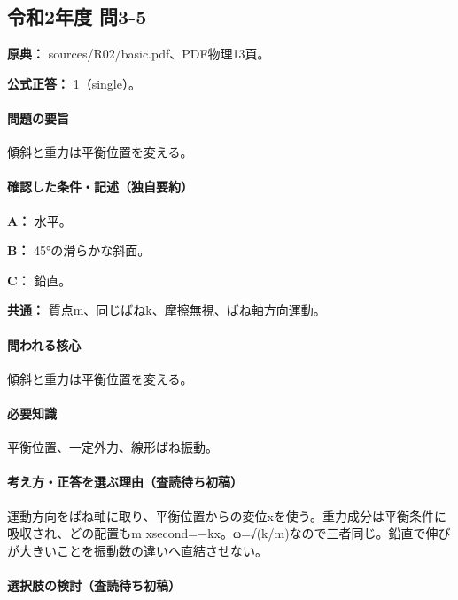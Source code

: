 \subsection{令和2年度 問3-5}
\label{q:r02-reg-basic-3-5}

\noindent\textbf{原典：} sources/R02/basic.pdf、PDF物理13頁。

\textbf{公式正答：} 1（single）。

\paragraph{問題の要旨} 傾斜と重力は平衡位置を変える。

\paragraph{確認した条件・記述（独自要約）}\mbox{}\par

\noindent\textbf{A：} 水平。\par

\noindent\textbf{B：} 45°の滑らかな斜面。\par

\noindent\textbf{C：} 鉛直。\par

\noindent\textbf{共通：} 質点m、同じばねk、摩擦無視、ばね軸方向運動。\par

\paragraph{問われる核心} 傾斜と重力は平衡位置を変える。

\paragraph{必要知識} 平衡位置、一定外力、線形ばね振動。

\paragraph{考え方・正答を選ぶ理由（査読待ち初稿）} 運動方向をばね軸に取り、平衡位置からの変位xを使う。重力成分は平衡条件に吸収され、どの配置もm xsecond=−kx。ω=√(k/m)なので三者同じ。鉛直で伸びが大きいことを振動数の違いへ直結させない。

\paragraph{選択肢の検討（査読待ち初稿）}\mbox{}\par

